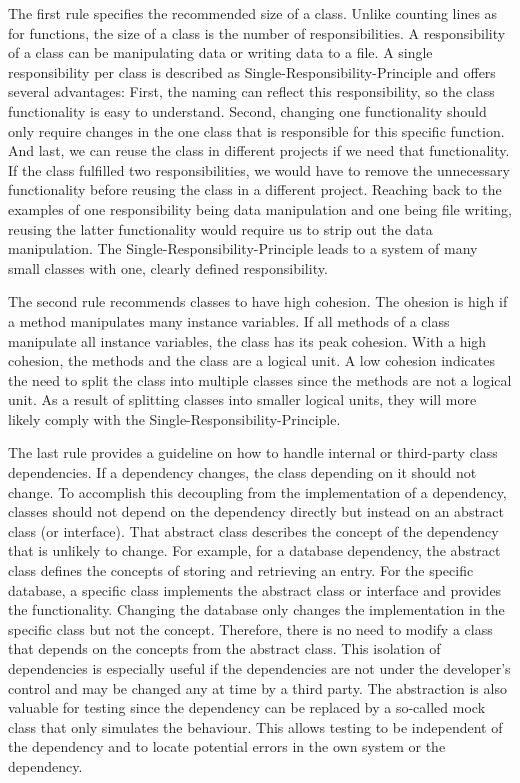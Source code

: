 The first rule specifies the recommended size of a class. Unlike counting lines as for functions, the size of a class is the number of responsibilities. A responsibility of a class can be manipulating data or writing data to a file. A single responsibility per class is described as Single-Responsibility-Principle and offers several advantages: First, the naming can reflect this responsibility, so the class functionality is easy to understand.
Second, changing one functionality should only require changes in the one class that is responsible for this specific function. And last, we can reuse the class in different projects if we need that functionality. If the class fulfilled two responsibilities, we would have to remove the unnecessary functionality before reusing the class in a different project. Reaching back to the examples of one responsibility being data manipulation and one being file writing, reusing the latter functionality would require us to strip out the data manipulation.
The Single-Responsibility-Principle leads to a system of many small classes with one, clearly defined responsibility.

The second rule recommends classes to have high cohesion. The ohesion is high if a method manipulates many instance variables. If all methods of a class manipulate all instance variables, the class has its peak cohesion. With a high cohesion, the methods and the class are a logical unit. A low cohesion indicates the need to split the class into multiple classes since the methods are not a logical unit. As a result of splitting classes into smaller logical units, they will more likely comply with the Single-Responsibility-Principle.

The last rule provides a guideline on how to handle internal or third-party class dependencies. If a dependency changes, the class depending on it should not change. To accomplish this decoupling from the implementation of a dependency, classes should not depend on the dependency directly but instead on an abstract class (or interface). That abstract class describes the concept of the dependency that is unlikely to change. For example, for a database dependency, the abstract class defines the concepts of storing and retrieving an entry. For the specific database, a specific class implements the abstract class or interface and provides the functionality. Changing the database only changes the implementation in the specific class but not the concept. Therefore, there is no need to modify a class that depends on the concepts from the abstract class. This isolation of dependencies is especially useful if the dependencies are not under the developer's control and may be changed any at time by a third party. The abstraction is also valuable for testing since the dependency can be replaced by a so-called mock class that only simulates the behaviour. This allows testing to be independent of the dependency and to locate potential errors in the own system or the dependency.

